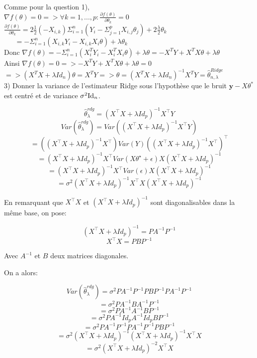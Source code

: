 Comme pour la question 1), \\
$\nabla f(\theta) = 0 => \forall k=1,...,p: \frac{\partial f(\theta)}{\partial \theta_k}=0$ \\

$\frac{\partial f(\theta)}{\partial \theta_k}=2\frac{1}{2} (-X_{i,k}) \Sigma_{i=1}^n (Y_i-\Sigma_{j=1}^pX_{i,j}\theta_j)+2\frac{\lambda}{2} \theta_k$ \\

$~~~~~~~=-\Sigma_{i=1}^n(X_{i,k}Y_i-X_{i,k}X_i\theta)+\lambda \theta_k$ \\

Donc $\nabla f(\theta)=-\Sigma_{i=1}^n(X_i^TY_i-X_i^TX_i\theta)+\lambda \theta=-X^TY+X^TX\theta + \lambda \theta$ \\

Ainsi $\nabla f(\theta)=0 => -X^TY+X^TX\theta + \lambda \theta=0$ \\
$=> (X^TX + \lambda Id_n)\theta = X^TY => \theta = (X^TX + \lambda Id_n)^{-1} X^TY = \hat{\theta}_{n,\lambda}^{Ridge} $ \\

3) Donner la variance de l'estimateur Ridge sous l’hypothèse que le bruit $\mathbf{y} -X \theta^*$ est centré et de variance $\sigma^2 {\rm Id}_n$.

$$\hat \theta_{\lambda}^{rdg} = (X^\top X+\lambda Id_p)^{-1}X^\top Y$$
$$Var(\hat \theta_{\lambda}^{rdg}) = Var((X^\top X+\lambda Id_p)^{-1}X^\top Y)$$ 
$$ = ((X^\top X+\lambda Id_p)^{-1}X^\top) Var(Y) ((X^\top X+\lambda Id_p)^{-1}X^\top)^\top$$ 
$$ = (X^\top X+\lambda Id_p)^{-1}X^\top Var(X \theta^\star + \epsilon)X(X^\top X+\lambda Id_p)^{-1}$$ 
$$ = (X^\top X+\lambda Id_p)^{-1}X^\top Var(\epsilon)X(X^\top X+\lambda Id_p)^{-1}$$ 
$$ = \sigma^2 (X^\top X+\lambda Id_p)^{-1}X^\top X(X^\top X+\lambda Id_p)^{-1}$$ 

En remarquant que $X^\top X$ et $(X^\top X+\lambda Id_p)^{-1}$ sont diagonalisables dans la même base, on pose:

$$(X^\top X+\lambda Id_p)^{-1} = PA^{-1}P^{-1}$$
$$X^\top X = PBP^{-1}$$

Avec $A^{-1}$ et $B$ deux matrices diagonales.

On a alors:

$$Var(\hat \theta_{\lambda}^{rdg}) = \sigma^2PA^{-1}P^{-1}PBP^{-1}PA^{-1}P^{-1}$$
$$ = \sigma^2PA^{-1}BA^{-1}P^{-1}$$
$$ = \sigma^2PA^{-1}A^{-1}BP^{-1}$$
$$ = \sigma^2PA^{-1}Id_pA^{-1}Id_pBP^{-1}$$
$$ = \sigma^2PA^{-1}P^{-1}PA^{-1}P^{-1}PBP^{-1}$$
$$ = \sigma^2 (X^\top X+\lambda Id_p)^{-1} (X^\top X+\lambda Id_p)^{-1}X^\top X$$
$$ = \sigma^2 (X^\top X+\lambda Id_p)^{-2} X^\top X$$


